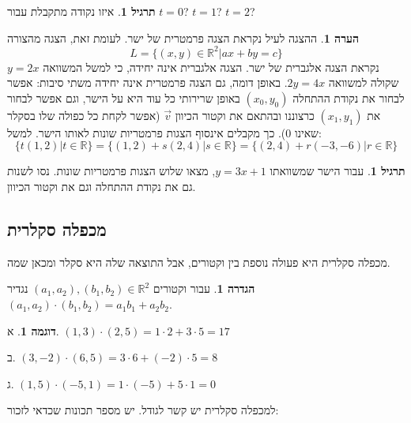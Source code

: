 \documentclass[12pt]{book}
\theoremstyle{plain}
\theoremstyle{definition}
\newtheorem{definition}[theorem]{הגדרה}
\newtheorem{example}[theorem]{דוגמה}
\newtheorem{exercise}[theorem]{תרגיל}
\newtheorem{remark}[theorem]{הערה}
\newcommand{\R}{\mathbb{R}}
\begin{document}
\begin{exercise}
איזו נקודה מתקבלת עבור \(t=0\)? \(t=1\)? \(t=2\)?
\end{exercise}

\begin{remark}
ההצגה לעיל נקראת הצגה פרמטרית של ישר. לעומת זאת, הצגה מהצורה
\begin{equation*}
    L=\{(x,y)\in\mathbb{R}^{2}|ax+by=c\}
\end{equation*}
נקראת הצגה אלגברית של
ישר. הצגה אלגברית אינה יחידה, כי למשל המשוואה \(y=2x\) שקולה למשוואה
\(2y=4x\). באופן דומה, גם הצגה פרמטרית אינה יחידה משתי סיבות: אפשר
לבחור את נקודת ההתחלה \((x_{0},y_{0})\) באופן שרירותי כל עוד היא
על הישר, וגם אפשר לבחור את \((x_{1},y_{1})\) כרצוננו ובהתאם את
וקטור הכיוון \(\vec{v}\) (אפשר לקחת כל כפולה שלו בסקלר שאינו 
\(0\)).
כך מקבלים אינסוף הצגות פרמטריות שונות לאותו הישר. למשל:
\begin{equation*}
	\{t(1,2)|t\in\mathbb{R}\}=\{(1,2)+s(2,4)|s\in\mathbb{R}\}=\{(2,4)+r(-3,-6)|r\in\mathbb{R}\}
\end{equation*}
\end{remark}

\begin{exercise}
עבור הישר שמשוואתו \(y=3x+1\), מצאו שלוש הצגות פרמטריות
שונות. נסו לשנות גם את נקודת ההתחלה וגם את וקטור הכיוון.
\end{exercise}

\subsection{מכפלה סקלרית}

מכפלה סקלרית היא פעולה נוספת בין וקטורים, אבל התוצאה שלה היא סקלר
ומכאן שמה.

\begin{definition}\label{def:scalar-product-plane}
עבור וקטורים \((a_1,a_2),(b_1,b_2)\in\R^2\)
נגדיר \((a_{1},a_{2})\cdot(b_{1},b_{2})=a_{1}b_{1}+a_{2}b_{2}\).
\end{definition}

\begin{example}
א. 
\((1,3)\cdot(2,5)=1\cdot2+3\cdot5=17\)

ב. 
\((3,-2)\cdot(6,5)=3\cdot6+(-2)\cdot5=8\)

ג. 
\((1,5)\cdot(-5,1)=1\cdot(-5)+5\cdot1=0\)
\end{example}


למכפלה סקלרית יש קשר לגודל. יש מספר תכונות שכדאי לזכור:
\end{document}

